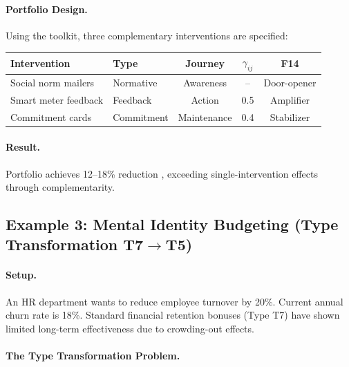 \paragraph{Portfolio Design.} Using the toolkit, three complementary interventions are specified:

\begin{table}[htbp]
\centering
\small
\begin{tabular}{@{}llccc@{}}
\toprule
\textbf{Intervention} & \textbf{Type} & \textbf{Journey} & \textbf{$\gamma_{ij}$} & \textbf{F14} \\
\midrule
Social norm mailers & Normative & Awareness & -- & Door-opener \\
Smart meter feedback & Feedback & Action & 0.5 & Amplifier \\
Commitment cards & Commitment & Maintenance & 0.4 & Stabilizer \\
\bottomrule
\end{tabular}
\end{table}

\paragraph{Result.} Portfolio achieves 12--18\% reduction \citep{allcott2011}, exceeding single-intervention effects through complementarity.


\subsection{Example 3: Mental Identity Budgeting (Type Transformation T7$\rightarrow$T5)}
\label{sec:hhh-example-identity-budgets}

\paragraph{Setup.} An HR department wants to reduce employee turnover by 20\%. Current annual churn rate is 18\%. Standard financial retention bonuses (Type T7) have shown limited long-term effectiveness due to crowding-out effects.

\paragraph{The Type Transformation Problem.}

